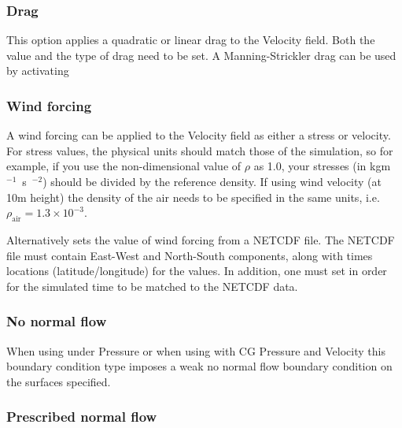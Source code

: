 \subsubsection{Drag}

This option applies a quadratic or linear drag to the Velocity field. Both the value and the type of drag need to be set. A Manning-Strickler drag can be used by activating 

\subsubsection{Wind forcing}\label{sec:wind_forcing}

A wind forcing can be applied to the Velocity field as either a stress or
velocity. For stress values, the physical units should match those of the
simulation, so for example, if you use the non-dimensional value of $\rho$
as 1.0, your stresses (in \unit{kgm\ensuremath{^{-1}}s\ensuremath{^{-2}}})
should be divided by the reference density.  If using wind velocity
(at 10m height) the density of the air needs to be specified in the same
units, i.e. $\rho_{\textrm{air}} = 1.3\times10^{-3}$.

Alternatively
sets the value of wind forcing from a NETCDF file. The NETCDF file must
contain East-West and North-South components, along with times locations
(latitude/longitude) for the values. In addition, one must set
 in order for the simulated
time to be matched to the NETCDF data.

\subsubsection{No normal flow}

When using  under Pressure  or when using 
 with CG Pressure and Velocity this boundary condition type 
imposes a weak no normal flow boundary condition on the surfaces specified.

\subsubsection{Prescribed normal flow}

